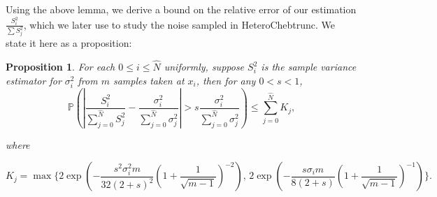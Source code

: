 \documentclass[pdflatex,sn-mathphys-num]{sn-jnl}%
\theoremstyle{thmstyleone}%
\newtheorem{proposition}[theorem]{Proposition}%
\theoremstyle{thmstyletwo}%
\theoremstyle{thmstylethree}%
\begin{document}
Using the above lemma, we derive a bound on the relative error of our estimation $\frac{S_i^2}{\sum S_j^2}$, which we later use to study the noise sampled in HeteroChebtrunc. We state it here as a proposition:

\begin{proposition}\label{cor:var_proportional_bound}
	For each $0\leq i\leq \hat{N}$ uniformly, suppose $S^2_i$ is the sample variance estimator for $\sigma^2_i$ from $m$ samples taken at $x_i$, then for any $0<s<1$, 
	\[\mathbb{P}\left(\left|\frac{S_i^2}{\sum_{j=0}^{\hat{N}}S_j^2} - \frac{\sigma_i^2}{\sum_{j=0}^{\hat{N}}\sigma_j^2}\right|>s\frac{\sigma_i^2}{\sum_{j=0}^{\hat{N}}\sigma_j^2}\right)\leq \sum_{j=0}^{\hat{N}} K_j,\]
	
	where 
	
	\[K_j = \max\{
	2\exp(-\frac{s^2\sigma_i^2 m}{32(2+s)^2}(1+\frac{1}{\sqrt{m-1}})^{-2})\text{, }
	2\exp(-\frac{s\sigma_im}{8(2+s)}(1+\frac{1}{\sqrt{m-1}})^{-1})
	\}.\]
	
	
\end{proposition}
\end{document}
